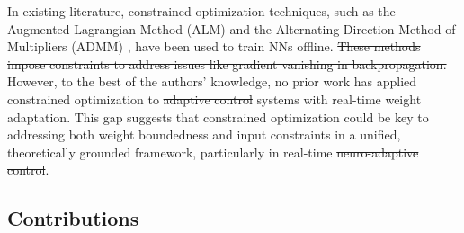 \documentclass[letterpaper, journal]{IEEEtran}
\providecommand{\DIFadd}[1]{{\protect\color{blue}\uwave{#1}}} %
\providecommand{\DIFdel}[1]{{\protect\color{red}\sout{#1}}} %
\providecommand{\DIFaddbegin}{} %
\providecommand{\DIFaddend}{} %
\providecommand{\DIFdelbegin}{} %
\providecommand{\DIFdelend}{} %
\begin{document}
In existing literature, constrained optimization techniques, such as the Augmented Lagrangian Method (ALM) \cite{Evens:2021aa} and the Alternating Direction Method of Multipliers (ADMM) \cite{Wang:2019aa,Taylor:2016aa}, have been used to train NNs offline. 
\DIFdelbegin \DIFdel{These methods impose constraints to address issues like gradient vanishing in backpropagation. 
}\DIFdelend %
However, to the best of the authors' knowledge, no prior work has applied constrained optimization to \DIFdelbegin \DIFdel{adaptive control }\DIFdelend \DIFaddbegin \DIFadd{NAC }\DIFaddend systems with real-time weight adaptation. 
This gap suggests that constrained optimization could be key to addressing both weight boundedness and input constraints in a unified, theoretically grounded framework, particularly in real-time \DIFdelbegin \DIFdel{neuro-adaptive control}\DIFdelend \DIFaddbegin \DIFadd{NAC}\DIFaddend .

\subsection{Contributions}
\end{document}
